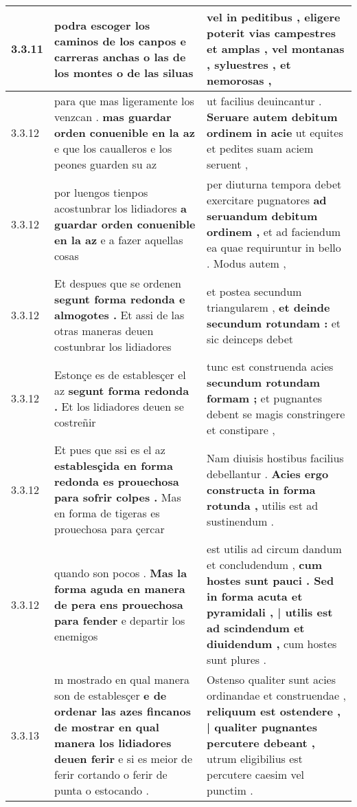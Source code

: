 \begin{tabular}{|p{1cm}|p{6.5cm}|p{6.5cm}|}
3.3.11 & podra escoger los caminos de los canpos \textbf{ e carreras anchas o las de los montes } o de las siluas & vel in peditibus , \textbf{ eligere poterit vias campestres et amplas , } vel montanas , syluestres , et nemorosas , \\\hline
3.3.12 & para que mas ligeramente los venzcan . \textbf{ mas guardar orden conuenible en la az } e que los caualleros e los peones guarden su az & ut facilius deuincantur . \textbf{ Seruare autem debitum ordinem in acie } ut equites et pedites suam aciem seruent , \\\hline
3.3.12 & por luengos tienpos acostunbrar los lidiadores \textbf{ a guardar orden conuenible en la az } e a fazer aquellas cosas & per diuturna tempora debet exercitare pugnatores \textbf{ ad seruandum debitum ordinem , } et ad faciendum ea quae requiruntur in bello . Modus autem , \\\hline
3.3.12 & Et despues que se ordenen \textbf{ segunt forma redonda e almogotes . } Et assi de las otras maneras deuen costunbrar los lidiadores & et postea secundum triangularem , \textbf{ et deinde secundum rotundam : } et sic deinceps debet \\\hline
3.3.12 & Estonçe es de establesçer el az \textbf{ segunt forma redonda . } Et los lidiadores deuen se costreñir & tunc est construenda acies \textbf{ secundum rotundam formam ; } et pugnantes debent se magis constringere et constipare , \\\hline
3.3.12 & Et pues que ssi es el az \textbf{ establesçida en forma redonda es prouechosa para sofrir colpes . } Mas en forma de tigeras es prouechosa para çercar & Nam diuisis hostibus facilius debellantur . \textbf{ Acies ergo constructa in forma rotunda , } utilis est ad sustinendum . \\\hline
3.3.12 & quando son pocos . \textbf{ Mas la forma aguda en manera de pera ens prouechosa para fender } e departir los enemigos & est utilis ad circum dandum et concludendum , \textbf{ cum hostes sunt pauci . Sed in forma acuta et pyramidali , | utilis est ad scindendum et diuidendum , } cum hostes sunt plures . \\\hline
3.3.13 & m mostrado en qual manera son de establesçer \textbf{ e de ordenar las azes fincanos de mostrar en qual manera los lidiadores deuen ferir } e si es meior de ferir cortando o ferir de punta o estocando . & Ostenso qualiter sunt acies ordinandae et construendae , \textbf{ reliquum est ostendere , | qualiter pugnantes percutere debeant , } utrum eligibilius est percutere caesim vel punctim . \\\hline

\end{tabular}
